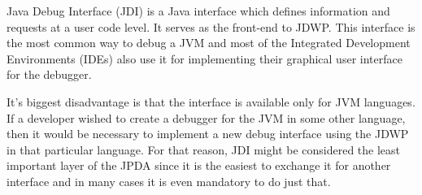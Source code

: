 \documentclass[..thesis.tex]{subfiles}
\begin{document}
Java Debug Interface (JDI) is a Java interface which defines information and requests at a user code level.
It serves as the front-end to JDWP.
This interface is the most common way to debug a JVM and most of the Integrated Development Environments (IDEs) also use it for implementing their graphical user interface for the debugger.

It's biggest disadvantage is that the interface is available only for JVM languages.
If a developer wished to create a debugger for the JVM in some other language, then it would be necessary to implement a new debug interface using the JDWP in that particular language.
For that reason, JDI might be considered the least important layer of the JPDA since it is the easiest to exchange it for another interface and in many cases it is even mandatory to do just that.
\end{document}
